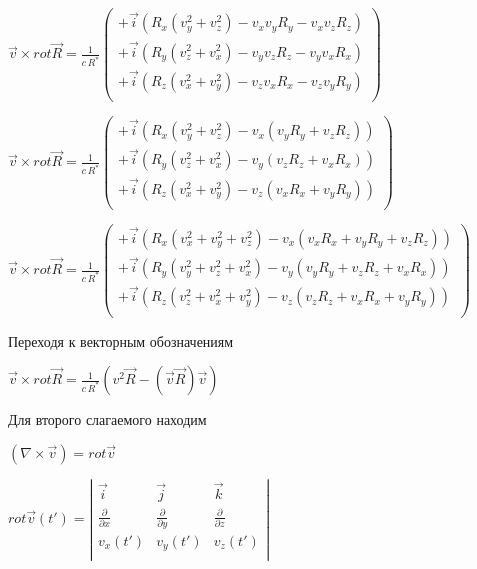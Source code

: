 \documentclass[11pt]{article}
\begin{document}
    \(\vec v \times rot \overrightarrow{R}=\frac{1}{c\,{{R}^{*}}}\left(\begin{array}{c}  +\vec i \left(R_x\left( v_y^2 + v_z^2\right) - v_x v_y R_y - v_x v_z R_z \right) \\  +\vec i \left(R_y\left( v_z^2 + v_x^2\right) - v_y v_z R_z - v_y v_x R_x \right) \\  +\vec i \left(R_z\left( v_x^2 + v_y^2\right) - v_z v_x R_x - v_z v_y R_y \right) \\ \end{array}\right)\)

    \(\vec v \times rot \overrightarrow{R}=\frac{1}{c\,{{R}^{*}}}\left(\begin{array}{c}  +\vec i \left(R_x\left( v_y^2 + v_z^2\right) - v_x \left(v_y R_y + v_z R_z \right) \right) \\  +\vec i \left(R_y\left( v_z^2 + v_x^2\right) - v_y \left(v_z R_z + v_x R_x \right) \right) \\  +\vec i \left(R_z\left( v_x^2 + v_y^2\right) - v_z \left(v_x R_x + v_y R_y \right) \right) \\ \end{array}\right)\)

    \(\vec v \times rot \overrightarrow{R}=\frac{1}{c\,{{R}^{*}}}\left(\begin{array}{c}  +\vec i \left(R_x\left(v_x^2 + v_y^2 + v_z^2\right) - v_x \left(v_x R_x + v_y R_y + v_z R_z \right) \right) \\  +\vec i \left(R_y\left(v_y^2 + v_z^2 + v_x^2\right) - v_y \left(v_y R_y + v_z R_z + v_x R_x \right) \right) \\  +\vec i \left(R_z\left(v_z^2 + v_x^2 + v_y^2\right) - v_z \left(v_z R_z + v_x R_x + v_y R_y \right) \right) \\ \end{array}\right)\)

    Переходя к векторным обозначениям

\(\vec v \times rot \overrightarrow{R}=\frac{1}{c\,{{R}^{*}}}\left(v^2 \vec R - \left(\vec v \vec R\right) \vec v\right)\)

    Для второго слагаемого находим

\(\left(\nabla \times \overrightarrow{v}\right) = rot \overrightarrow{v}\)

    \(rot \overrightarrow{v}\left(t'\right)=\left|\begin{array}{ccc}  \vec i & \vec j & \vec k\\  \frac{\partial}{\partial x} & \frac{\partial}{\partial y} & \frac{\partial}{\partial z}\\  v_{x}\left(t'\right) & v_{y}\left(t'\right) & v_{z}\left(t'\right)\\ \end{array}\right|\)
\end{document}
